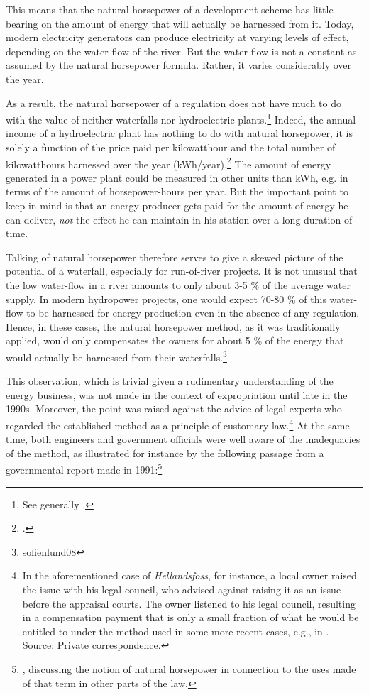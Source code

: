 This means that the natural horsepower of a development scheme has little bearing on the amount of energy that will actually be harnessed from it. Today, modern electricity generators can produce electricity at varying levels of effect, depending on the water-flow of the river. But the water-flow is not a constant as assumed by the natural horsepower formula. Rather, it varies considerably over the year.

As a result, the natural horsepower of a regulation does not have much to do with the value of neither waterfalls nor hydroelectric plants.\footnote{See generally \cite{sofienlund08}.} Indeed, the annual income of a hydroelectric plant has nothing to do with natural horsepower, it is solely a function of the price paid per kilowatthour and the total number of kilowatthours harnessed over the year (kWh/year).\footcite{sofienlund08} The amount of energy generated in a power plant could be measured in other units than kWh, e.g. in terms of the amount of horsepower-hours per year. But the important point to keep in mind is that an energy producer gets paid for the amount of energy he can deliver, \emph{not} the effect he can maintain in his station over a long duration of time. %

Talking of natural horsepower therefore serves to give a skewed picture of the potential of a waterfall, especially for run-of-river projects. It is not unusual that the low water-flow in a river amounts to only about 3-5 \% of the average water supply. In modern hydropower projects, one would expect 70-80 \% of this water-flow to be harnessed for energy production even in the absence of any regulation. Hence, in these cases, the natural horsepower method, as it was traditionally applied, would only compensates the owners for about 5 \% of the energy that would actually be harnessed from their waterfalls.\footnote{sofienlund08}

This observation, which is trivial given a rudimentary understanding of the energy business, was not made in the context of expropriation until late in the 1990s. Moreover, the point was raised against the advice of legal experts who regarded the established method as a principle of customary law.\footnote{In the aforementioned case of {\it Hellandsfoss}, for instance, a local owner raised the issue with his legal council, who advised against raising it as an issue before the appraisal courts. The owner listened to his legal council, resulting in a compensation payment that is only a small fraction of what he would be entitled to under the method used in some more recent cases, e.g., in \cite{sauda08}. Source: Private correspondence.} At the same time, both engineers and government officials were well aware of the inadequacies of the method, as illustrated for instance by the following passage from a governmental report made in 1991:\footnote{\cite[19]{otprp50}, discussing the notion of natural horsepower in connection to the uses made of that term in other parts of the law.}

